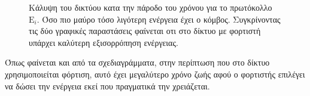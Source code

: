 \begin{figure}[H]
  \centering
  \caption{Κάλυψη του δικτύου κατα την πάροδο του χρόνου για το πρωτόκολλο $\text{E}_{i}$. Όσο πιο μαύρο τόσο λιγότερη ενέργεια έχει ο κόμβος. Συγκρίνοντας τις δύο
γραφικές παραστάσεις φαίνεται οτι στο δίκτυο με φορτιστή υπάρχει καλύτερη εξισορρόπηση ενέργειας.}
  \label{fig:1exp_4_3}
\end{figure}

Όπως φαίνεται και από τα σχεδιαγράμματα, στην περίπτωση που στο δίκτυο χρησιμοποιείται φόρτιση, αυτό έχει μεγαλύτερο χρόνο ζωής αφού ο φορτιστής επιλέγει να δώσει
την ενέργεια εκεί που πραγματικά την χρειάζεται.







